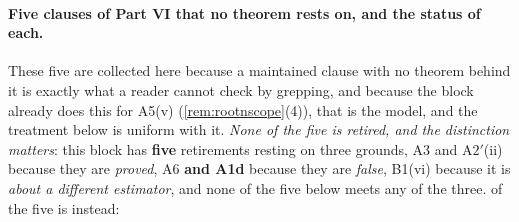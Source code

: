 
\paragraph{Five clauses of Part VI that no theorem rests on, and the status of each.}
These five are collected here because a maintained clause with no theorem behind it is exactly what a
reader cannot check by grepping, and because the block already does this for A5(v)
(\cref{rem:rootnscope}\textup{(4)}), that is the model, and the treatment below is uniform with
it. \emph{None of the five is retired, and the distinction matters}: this block has \textbf{five}
retirements resting on three grounds, A3 and A$2'$(ii) because they are \emph{proved}, A6 \textbf{and
A1d} because they are \emph{false}, B1(vi) because it is \emph{about a different estimator}, and none of
the five below meets any
of the three.
of the five is instead:
